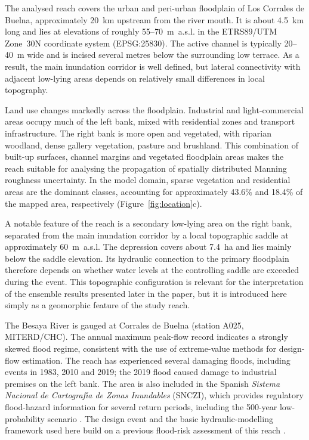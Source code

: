 \documentclass[a4paper,fleqn]{cas-sc}
\begin{document}
The analysed reach covers the urban and peri-urban floodplain of Los Corrales de Buelna, approximately 20~km upstream from the river mouth. It is about 4.5~km long and lies at elevations of roughly 55--70~m~a.s.l. in the ETRS89/UTM Zone~30N coordinate system (EPSG:25830). The active channel is typically 20--40~m wide and is incised several metres below the surrounding low terrace. As a result, the main inundation corridor is well defined, but lateral connectivity with adjacent low-lying areas depends on relatively small differences in local topography.

Land use changes markedly across the floodplain. Industrial and light-commercial areas occupy much of the left bank, mixed with residential zones and transport infrastructure. The right bank is more open and vegetated, with riparian woodland, dense gallery vegetation, pasture and brushland. This combination of built-up surfaces, channel margins and vegetated floodplain areas makes the reach suitable for analysing the propagation of spatially distributed Manning roughness uncertainty. In the model domain, sparse vegetation and residential areas are the dominant classes, accounting for approximately 43.6\% and 18.4\% of the mapped area, respectively (Figure~\ref{fig:location}c).

A notable feature of the reach is a secondary low-lying area on the right bank, separated from the main inundation corridor by a local topographic saddle at approximately 60~m~a.s.l. The depression covers about 7.4~ha and lies mainly below the saddle elevation. Its hydraulic connection to the primary floodplain therefore depends on whether water levels at the controlling saddle are exceeded during the event. This topographic configuration is relevant for the interpretation of the ensemble results presented later in the paper, but it is introduced here simply as a geomorphic feature of the study reach.

The Besaya River is gauged at Corrales de Buelna (station A025, MITERD/CHC). The annual maximum peak-flow record indicates a strongly skewed flood regime, consistent with the use of extreme-value methods for design-flow estimation. The reach has experienced several damaging floods, including events in 1983, 2010 and 2019; the 2019 flood caused damage to industrial premises on the left bank. The area is also included in the Spanish \emph{Sistema Nacional de Cartograf\'{\i}a de Zonas Inundables} (SNCZI), which provides regulatory flood-hazard information for several return periods, including the 500-year low-probability scenario \citep{miterd2026saih,miterd2026snczi}. The design event and the basic hydraulic-modelling framework used here build on a previous flood-risk assessment of this reach \citep{navas2018rop}. 
\end{document}
